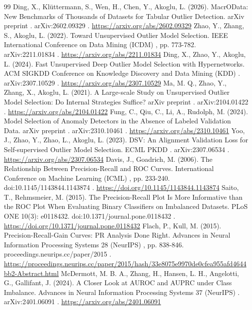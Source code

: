 \documentclass[3p,twocolumn]{elsarticle}
\begin{document}
\begin{thebibliography}{99}
\label{r20} Ding, X., Klüttermann, S., Wen, H., Chen, Y., Akoglu, L. (2026). MacrOData: New Benchmarks of Thousands of Datasets for Tabular Outlier Detection. arXiv preprint . arXiv:2602.09329 . \url{https://arxiv.org/abs/2602.09329}
\label{r21} Zhao, Y., Zhang, S., Akoglu, L. (2022). Toward Unsupervised Outlier Model Selection. IEEE International Conference on Data Mining (ICDM) , pp. 773-782. arXiv:2211.01834 . \url{https://arxiv.org/abs/2211.01834}
\label{r22} Ding, X., Zhao, Y., Akoglu, L. (2024). Fast Unsupervised Deep Outlier Model Selection with Hypernetworks. ACM SIGKDD Conference on Knowledge Discovery and Data Mining (KDD) . arXiv:2307.10529 . \url{https://arxiv.org/abs/2307.10529}
\label{r23} Ma, M. Q., Zhao, Y., Zhang, X., Akoglu, L. (2021). A Large-scale Study on Unsupervised Outlier Model Selection: Do Internal Strategies Suffice? arXiv preprint . arXiv:2104.01422 . \url{https://arxiv.org/abs/2104.01422}
\label{r24} Fung, C., Qiu, C., Li, A., Rudolph, M. (2024). Model Selection of Anomaly Detectors in the Absence of Labeled Validation Data. arXiv preprint . arXiv:2310.10461 . \url{https://arxiv.org/abs/2310.10461}
\label{r25} Yoo, J., Zhao, Y., Zhao, L., Akoglu, L. (2023). DSV: An Alignment Validation Loss for Self-supervised Outlier Model Selection. ECML PKDD . arXiv:2307.06534 . \url{https://arxiv.org/abs/2307.06534}
\label{r26} Davis, J., Goadrich, M. (2006). The Relationship Between Precision-Recall and ROC Curves. International Conference on Machine Learning (ICML) , pp. 233-240. doi:10.1145/1143844.1143874 . \url{https://doi.org/10.1145/1143844.1143874}
\label{r27} Saito, T., Rehmsmeier, M. (2015). The Precision-Recall Plot Is More Informative than the ROC Plot When Evaluating Binary Classifiers on Imbalanced Datasets. PLoS ONE 10(3): e0118432. doi:10.1371/journal.pone.0118432 . \url{https://doi.org/10.1371/journal.pone.0118432}
\label{r28} Flach, P., Kull, M. (2015). Precision-Recall-Gain Curves: PR Analysis Done Right. Advances in Neural Information Processing Systems 28 (NeurIPS) , pp. 838-846. proceedings.neurips.cc/paper/2015 . \url{https://proceedings.neurips.cc/paper/2015/hash/33e8075e9970de0cfea955afd4644bb2-Abstract.html}
\label{r29} McDermott, M. B. A., Zhang, H., Hansen, L. H., Angelotti, G., Gallifant, J. (2024). A Closer Look at AUROC and AUPRC under Class Imbalance. Advances in Neural Information Processing Systems 37 (NeurIPS) . arXiv:2401.06091 . \url{https://arxiv.org/abs/2401.06091}

\end{thebibliography}
\end{document}
